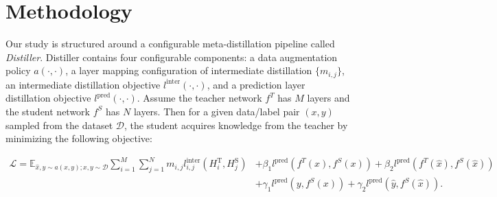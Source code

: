 \documentclass[11pt]{article}
\begin{document}
\section{Methodology}
\label{methodology}
Our study is structured around a configurable meta-distillation pipeline called \emph{Distiller}. Distiller contains four configurable components: a data augmentation policy $a(\cdot, \cdot)$, a layer mapping configuration of intermediate distillation $\{m_{i, j}\}$,  an intermediate distillation objective  $l^{\text{inter}}(\cdot,\cdot)$, and a prediction layer distillation objective $l^{\text{pred}}(\cdot,\cdot)$. Assume the teacher network $f^T$ has $M$ layers and the student network $f^S$ has $N$ layers. Then for a given  data/label pair $(x,y)$ sampled from the dataset $\mathcal{D}$, the student acquires knowledge from the teacher by minimizing the following objective: 
\begin{footnotesize}
\begin{equation}
\label{eq:objective}
\begin{aligned}
    \mathcal{L} = \mathbb{E}_{\hat{x}, \hat{y} \sim a(x, y); x, y \sim \mathcal{D}} \sum_{i=1}^M \sum_{j=1}^N m_{i,j}l_{i,j}^{\text{inter}}(H_i^{\text{T}},H_j^{\text{S}})
    &+ \beta_1 l^{\text{pred}}(f^{T}(x),f^{S}(x))
    + \beta_2 l^{\text{pred}}(f^{T}(\hat{x}),f^{S}(\hat{x}))\\
    &+ \gamma_1 l^{\text{pred}}(y, f^{S}(x)) 
    + \gamma_2 l^{\text{pred}}(\hat{y}, f^{S}(\hat{x})).
\end{aligned}
\end{equation}
\end{footnotesize}
\end{document}
